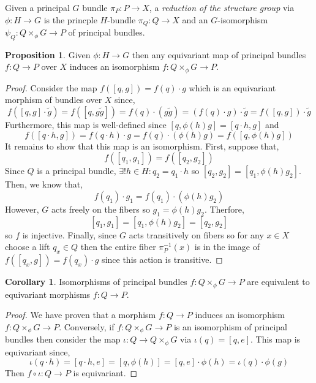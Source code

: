\documentclass[12pt]{extarticle}
\theoremstyle{definition}
\newtheorem{proposition}[theorem]{Proposition}
\newtheorem{corollary}[theorem]{Corollary}
\newenvironment{definition}[1][Definition:]{\begin{trivlist}
\item[\hskip \labelsep {\bfseries #1}]}{\end{trivlist}}
\begin{document}
\begin{definition}
Given a principal $G$ bundle $\pi_P : P \to X$, a \textit{reduction of the structure group} via $\phi : H \to G$ is the princple $H$-bundle $\pi_Q : Q \to X$ and an $G$-isomorphism $\psi_Q : Q \times_\phi G \to P$ of principal bundles. 
\end{definition}

\begin{proposition}
Given $\phi : H \to G$ then any equivariant map of principal bundles $f : Q \to P$ over $X$ induces an isomorphism $f : Q \times_\phi G \to P$.
\end{proposition}

\begin{proof}
Consider the map $f([q, g]) = f(q) \cdot g$ which is an equivariant morphism of bundles over $X$ since,
\[ f([q, g] \cdot \tilde{g}) = f([q, g \tilde{g}]) = f(q) \cdot (g\tilde{g}) = (f(q) \cdot g) \cdot \tilde{g} = f([q, g]) \cdot \tilde{g} \]
Furthermore, this map is well-defined since $[q, \phi(h) g] = [q \cdot h, g]$ and
\[ f([q \cdot h, g]) = f(q \cdot h) \cdot g = f(q) \cdot (\phi(h)g) = f([q, \phi(h)g]) \]
It remains to show that this map is an isomorphism.  First, suppose that,
\[ f([q_1, g_1]) = f([q_2, g_2]) \]
Since $Q$ is a principal bundle, $\exists ! h \in H : q_2 = q_1 \cdot h$ so $[q_2, g_2] = [q_1, \phi(h) g_2]$. Then, we know that,
\[ f(q_1) \cdot g_1 = f(q_1) \cdot (\phi(h) g_2) \]
However, $G$ acts freely on the fibers so $g_1 = \phi(h) g_2$. Therfore, 
\[ [q_1, g_1] = [q_1, \phi(h) g_2] = [q_2, g_2] \]
 so $f$ is injective. Finally, since $G$ acts transitively on fibers so for any $x \in X$ choose a lift $q_x \in Q$ then the entire fiber $\pi_P^{-1}(x)$ is in the image of $f([q_x, g]) = f(q_x) \cdot g$ since this action is transitive. 
\end{proof}

\begin{corollary}
Isomorphisms of principal bundles $f : Q \times_\phi G \to P$ are equivalent to equivariant morphisms $f : Q \to P$.
\end{corollary}

\begin{proof}
We have proven that a morphism $f : Q \to P$ induces an isomorphism $f : Q \times_\phi G \to P$. Conversely, if $f : Q \times_\phi G \to P$ is an isomorphism of principal bundles then consider the map $\iota : Q \to Q \times_\phi G$ via $\iota(q) = [q, e]$. This map is equivariant since,
\[ \iota(q \cdot h) = [q \cdot h, e] = [q, \phi(h)] = [q, e] \cdot \phi(h) = \iota(q) \cdot \phi(g) \]
Then $f \circ \iota : Q \to P$ is equivariant.
\end{proof}
\end{document}
